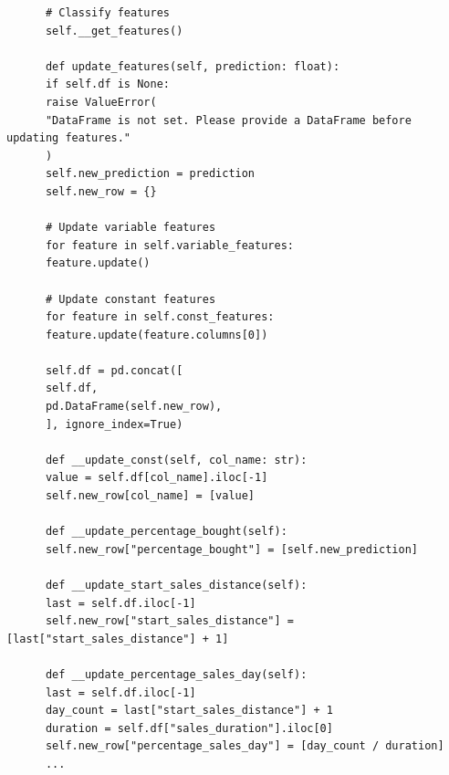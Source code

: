 \documentclass[a4paper,12pt]{report}  %
\begin{document}
\begin{verbatim}
      # Classify features
      self.__get_features()

      def update_features(self, prediction: float):
      if self.df is None:
      raise ValueError(
      "DataFrame is not set. Please provide a DataFrame before updating features."
      )
      self.new_prediction = prediction
      self.new_row = {}

      # Update variable features
      for feature in self.variable_features:
      feature.update()

      # Update constant features
      for feature in self.const_features:
      feature.update(feature.columns[0])

      self.df = pd.concat([
      self.df,
      pd.DataFrame(self.new_row),
      ], ignore_index=True)

      def __update_const(self, col_name: str):
      value = self.df[col_name].iloc[-1]
      self.new_row[col_name] = [value]

      def __update_percentage_bought(self):
      self.new_row["percentage_bought"] = [self.new_prediction]

      def __update_start_sales_distance(self):
      last = self.df.iloc[-1]
      self.new_row["start_sales_distance"] = [last["start_sales_distance"] + 1]

      def __update_percentage_sales_day(self):
      last = self.df.iloc[-1]
      day_count = last["start_sales_distance"] + 1
      duration = self.df["sales_duration"].iloc[0]
      self.new_row["percentage_sales_day"] = [day_count / duration]
      ...
      \end{verbatim}
\end{document}

